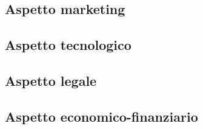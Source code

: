 \subsection{Aspetto marketing}


\subsection{Aspetto tecnologico}


\subsection{Aspetto legale}


\subsection{Aspetto economico-finanziario}